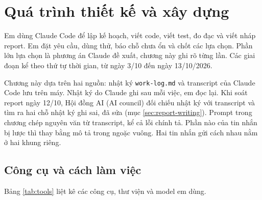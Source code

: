 \chapter{Quá trình thiết kế và xây dựng}

Em dùng Claude Code để lập kế hoạch, viết code, viết test, đo đạc và viết nháp report. Em đặt yêu cầu, dùng thử, báo chỗ chưa ổn và chốt các lựa chọn. Phần lớn lựa chọn là phương án Claude đề xuất, chương này ghi rõ từng lần. Các giai đoạn kể theo thứ tự thời gian, từ ngày 3/10 đến ngày 13/10/2026.

Chương này dựa trên hai nguồn: nhật ký \texttt{work-log.md} và transcript của Claude Code lưu trên máy. Nhật ký do Claude ghi sau mỗi việc, em đọc lại. Khi soát report ngày 12/10, Hội đồng AI (AI council) đối chiếu nhật ký với transcript và tìm ra hai chỗ nhật ký ghi sai, đã sửa (mục \ref{sec:report-writing}). Prompt trong chương chép nguyên văn từ transcript, kể cả lỗi chính tả. Phần nào của tin nhắn bị lược thì thay bằng mô tả trong ngoặc vuông. Hai tin nhắn gửi cách nhau nằm ở hai khung riêng.

\section{Công cụ và cách làm việc}

Bảng \ref{tab:tools} liệt kê các công cụ, thư viện và model em dùng.

